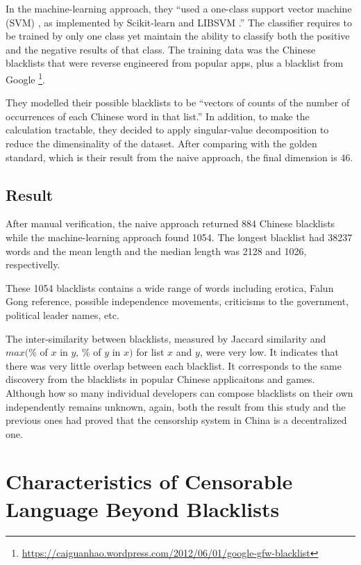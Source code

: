 \documentclass[11pt]{article} %
\begin{document}
In the machine-learning approach, they ``used a one-class support vector machine (SVM) \cite{scholkopf2001estimating}, as implemented by Scikit-learn \cite{pedregosa2011scikit} and LIBSVM \cite{chang2011libsvm}.'' The classifier requires to be trained by only one class yet maintain the ability to classify both the positive and the negative results of that class. The training data was the Chinese blacklists that were reverse engineered from popular apps, plus a blacklist from Google \footnote{\url{https://caiguanhao.wordpress.com/2012/06/01/google-gfw-blacklist}}.

They modelled their possible blacklists to be ``vectors of counts of the number of occurrences of each Chinese word in that list.''\cite{knockel2018effect} In addition, to make the calculation tractable, they decided to apply singular-value decomposition to reduce the dimensinality of the dataset. After comparing with the golden standard, which is their result from the naive approach, the final dimension is 46.

\subsection{Result}

After manual verification, the naive approach returned 884 Chinese blacklists while the machine-learning approach found 1054. The longest blacklist had 38237 words and the mean length and the median length was 2128 and 1026, respectivelly.

These 1054 blacklists contains a wide range of words including erotica, Falun Gong reference, possible independence movements, criticisms to the 
government, political leader names, etc.

The inter-similarity between blacklists, measured by Jaccard similarity and $max(\% $ of $x$ in $y$, $\%$ of $y$ in $x)$ for list $x$ and $y$, were very low. It indicates that there was very little overlap between each blacklist. It corresponds to the same discovery from the blacklists in popular Chinese applicaitons and games. Although how so many individual developers can compose blacklists on their own independently remains unknown, again, both the result from this study and the previous ones had proved that the censorship system in China is a decentralized one.

\section{Characteristics of Censorable Language Beyond Blacklists}
\end{document}
